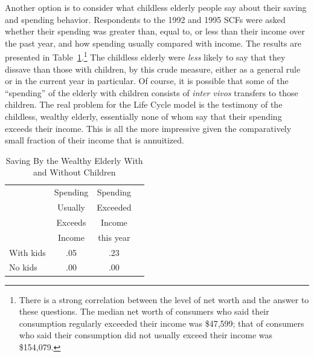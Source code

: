 \documentclass[titlepage,12pt]{article}
\begin{document}
Another option is to consider what childless elderly people 
say about their saving and spending behavior.  Respondents to the 1992 
and 1995 SCFs were asked whether their spending was greater than, 
equal to, or less than their income over the past year, and how 
spending usually compared with income.  The results are presented in 
Table~\ref{table:SavOfRichOldByKidStatus}.\footnote{There is a strong 
correlation between the level of net worth and the answer to these 
questions.  The median net worth of consumers who said their 
consumption regularly exceeded their income was \$47,599; that of 
consumers who said their consumption did not usually exceed their 
income was \$154,079.} The childless elderly were {\it less} likely to 
say that they dissave than those with children, by this crude measure, 
either as a general rule or in the current year in particular.  Of 
course, it is possible that some of the ``spending'' of the elderly 
with children consists of {\it inter vivos} transfers to those 
children.  The real problem for the Life Cycle model is the testimony 
of the childless, wealthy elderly, essentially none of whom say that 
their spending exceeds their income.  This is all the more impressive 
given the comparatively small fraction of their income that is 
annuitized.
\begin{table}[tbp]
\center
\begin{tabular}[c]{lccc}
          & Spending  & Spending  \\ 
  	      &  Usually   & Exceeded  \\
   	      &  Exceeds   & Income    \\
   	      &  Income    & this year \\ \hline
With kids &  .05    & .23       \\ 
No kids   &  .00    & .00       \\ \hline
\end{tabular}
	\caption{Saving By the Wealthy Elderly With and Without Children}
	\protect\label{table:SavOfRichOldByKidStatus}
\end{table}
\end{document}
